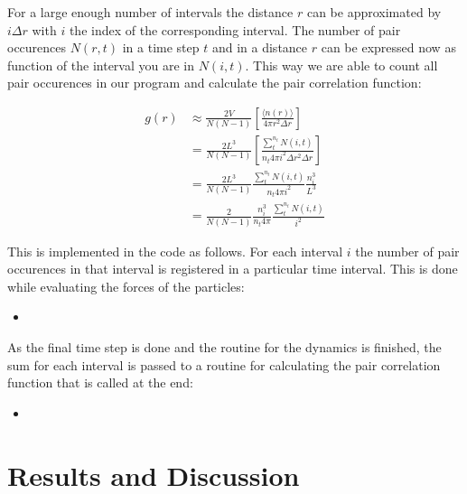 \documentclass[
10pt, %
a4paper, %
oneside, %
headinclude,footinclude, %
BCOR5mm, %
]{scrartcl}
\newcommand{\insertcode}[2]{\begin{itemize}\item[]\end{itemize}} %
\begin{document}
\noindent
For a large enough number of intervals the distance $r$ can be approximated by $i\Delta r$ with $i$ the index of the corresponding interval. The number of pair occurences $N(r,t)$ in a time step $t$ and in a distance $r$ can be expressed now as function of the interval you are in $N(i,t)$. This way we are able to count all pair occurences in our program and calculate the pair correlation function:

\begin{align}
g(r) &\approx \frac{2V}{N(N-1)} \left [ \frac{\langle n(r) \rangle }{ 4 \pi r^2 \Delta r} \right ] \\
&= \frac{2L^3}{N(N-1)} \left [ \frac{\sum_t^{n_t} N(i,t)}{n_t 4 \pi i^2 \Delta r^2 \Delta r} \right ] \\
&= \frac{2L^3}{N(N-1)} \frac{\sum_t^{n_t} N(i,t)}{n_t 4 \pi i^2} \frac{n_i^3}{L^3} \\
&= \frac{2}{N(N-1)} \frac{n_i^3}{n_t 4 \pi} \frac{\sum_t^{n_t} N(i,t)}{i^2}
\end{align}

\noindent
This is implemented in the code as follows. For each interval $i$ the number of pair occurences in that interval is registered in a particular time interval. This is done while evaluating the forces of the particles:
\insertcode{"Scripts/pair_correlation_snippet_1.f90"}{Updating the histogram for each interval} %

\noindent
As the final time step is done and the routine for the dynamics is finished, the sum for each interval is passed to a routine for calculating the pair correlation function that is called at the end:
\insertcode{"Scripts/pair_correlation_snippet_2.f90"}{Factors are needed to prevent overflow errors} %








\newpage

\section{Results and Discussion}
\end{document}
